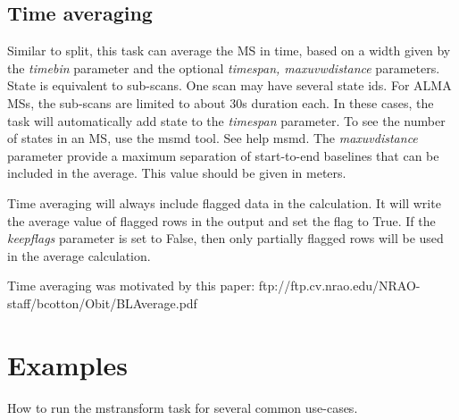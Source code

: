 \subsection{Time averaging}
Similar to split, this task can average the MS in time, based on a width given by the
{\it timebin} parameter and the optional {\it timespan, maxuvwdistance}
parameters. State is equivalent to sub-scans. One scan may have several
state ids. For ALMA MSs, the sub-scans are limited to about 30s duration each.
In these cases, the task will automatically add state to the {\it timespan} 
parameter. To see the number of states in an MS, use the msmd tool. See help
msmd. The {\it maxuvdistance} parameter provide a maximum separation of
start-to-end baselines that can be included in the average. This value should be
given in meters.

Time averaging will always include flagged data in the calculation. It will
write the average value of flagged rows in the output and set the flag to
True.
If the {\it keepflags} parameter is set to False, then only partially flagged
rows will be used in the average calculation. 

Time averaging was motivated by this paper:
ftp://ftp.cv.nrao.edu/NRAO-staff/bcotton/Obit/BLAverage.pdf



\section{Examples}\label{Sec:Examples}
How to run the mstransform task for several common use-cases.

